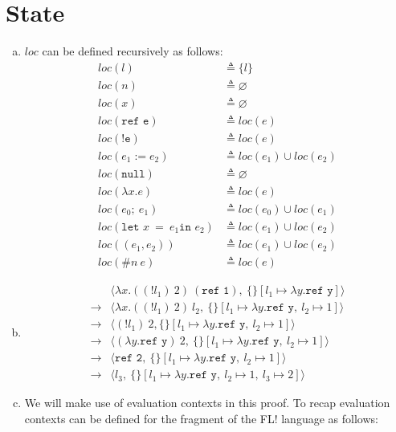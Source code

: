 \documentclass[10pt]{article}
\begin{document}
\section{State}%
\begin{enumerate} [(a)]
    \item $loc$ can be defined recursively as follows:
    \begin{align*}
      loc (l) &\triangleq \{l\}\\
      loc (n) &\triangleq \varnothing\\  
      loc (x) &\triangleq \varnothing\\
      loc (\texttt{ref e}) &\triangleq loc(e)\\
      loc (\texttt{!e}) &\triangleq loc(e)\\
      loc (e_1 := e_2) &\triangleq loc(e_1) \cup loc(e_2)\\
      loc (\texttt{null}) &\triangleq \varnothing\\
      loc (\lambda x.e) &\triangleq loc(e)\\
      loc (e_0;~e_1) &\triangleq loc(e_0) \cup loc(e_1)\\
      loc (\texttt{let } x~=~e_1 \texttt{in } e_2) &\triangleq loc(e_1) \cup loc(e_2)\\
      loc ((e_1, e_2)) &\triangleq loc(e_1) \cup loc(e_2)\\
      loc (\#n~e) &\triangleq loc(e)
    \end{align*}
    \item 
    \begin{align*}
    &\langle \lambda x.((!l_1)~2)~(\texttt{ref 1}),~\{\}[l_1 \mapsto \lambda y. \texttt{ref y}]\rangle\\
    \rightarrow &\langle \lambda x.((!l_1)~2)~l_2,~\{\}[l_1 \mapsto \lambda y. \texttt{ref y},~l_2 \mapsto 1]\rangle\\
    \rightarrow &\langle (!l_1)~2, \{\}[l_1 \mapsto \lambda y. \texttt{ref y},~l_2 \mapsto 1]\rangle\\
    \rightarrow &\langle (\lambda y.\texttt{ref y})~2,~\{\}[l_1 \mapsto \lambda y. \texttt{ref y},~l_2 \mapsto 1]\rangle\\
    \rightarrow &\langle \texttt{ref 2},~\{\}[l_1 \mapsto \lambda y. \texttt{ref y},~l_2 \mapsto 1]\rangle\\
    \rightarrow &\langle l_3,~\{\}[l_1 \mapsto \lambda y. \texttt{ref y},~l_2 \mapsto 1,~l_3 \mapsto 2]\rangle
    \end{align*}
    \item We will make use of evaluation contexts in this proof. To recap evaluation contexts can be defined for the fragment of the FL! language as follows:


\end{enumerate}
\end{document}

